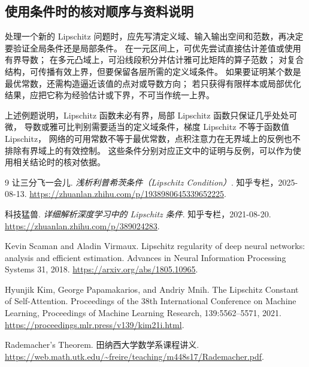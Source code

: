 \documentclass[UTF8,12pt,a4paper,fontset=fandol]{ctexart}
\begin{document}
\subsection{使用条件时的核对顺序与资料说明}
\label{subsec:lip-reading}

处理一个新的 Lipschitz 问题时，应先写清定义域、输入输出空间和范数，再决定要验证全局条件还是局部条件。
在一元区间上，可优先尝试直接估计差值或使用有界导数；
在多元凸域上，可沿线段积分并估计雅可比矩阵的算子范数；
对复合结构，可传播有效上界，但要保留各层所需的定义域条件。
如果要证明某个数是最优常数，还需构造逼近该值的点对或导数方向；
若只获得有限样本或局部优化结果，应把它称为经验估计或下界，不可当作统一上界。

上述例题说明，Lipschitz 函数未必有界，局部 Lipschitz 函数只保证几乎处处可微，
导数或雅可比判别需要适当的定义域条件，梯度 Lipschitz 不等于函数值 Lipschitz，
网络的可用常数不等于最优常数，点积注意力在无界域上的反例也不排除有界域上的有效控制。
这些条件分别对应正文中的证明与反例，可以作为使用相关结论时的核对依据。

\begin{thebibliography}{9}
让三分飞一会儿.
\emph{浅析利普希茨条件（Lipschitz Condition）}.
知乎专栏，2025-08-13.
\url{https://zhuanlan.zhihu.com/p/1938980645339652225}.

科技猛兽.
\emph{详细解析深度学习中的 Lipschitz 条件}.
知乎专栏，2021-08-20.
\url{https://zhuanlan.zhihu.com/p/389024283}.

Kevin Scaman and Aladin Virmaux.
Lipschitz regularity of deep neural networks: analysis and efficient estimation.
Advances in Neural Information Processing Systems 31, 2018.
\url{https://arxiv.org/abs/1805.10965}.

Hyunjik Kim, George Papamakarios, and Andriy Mnih.
The Lipschitz Constant of Self-Attention.
Proceedings of the 38th International Conference on Machine Learning,
Proceedings of Machine Learning Research, 139:5562--5571, 2021.
\url{https://proceedings.mlr.press/v139/kim21i.html}.

Rademacher's Theorem.
田纳西大学数学系课程讲义.
\url{https://web.math.utk.edu/~freire/teaching/m448s17/Rademacher.pdf}.
\end{thebibliography}
\end{document}
